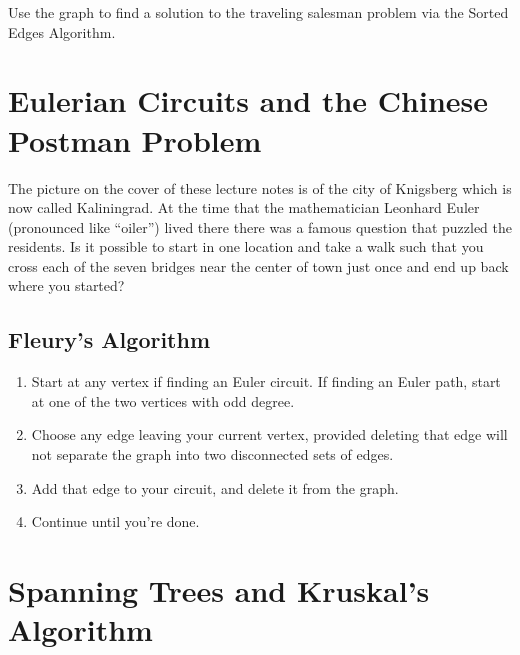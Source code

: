 \begin{exercise}\label{ex:sea}
  Use the graph to find a solution to the traveling salesman problem
  via the Sorted Edges Algorithm.

  

\end{exercise}

\newpage

\section{Eulerian Circuits and the Chinese Postman Problem}%
\label{sec:eulerian-circuits}

The picture on the cover of these lecture notes is of the city of
Knigsberg which is now called Kaliningrad. At the time that the
mathematician Leonhard Euler (pronounced like ``oiler'') lived there
there was a famous question that puzzled the residents. Is it possible
to start in one location and take a walk such that you cross each of
the seven bridges near the center of town just once and end up back
where you started?

\subsection{Fleury's Algorithm}%
\label{sub:Fleury's Algorithm}

\begin{algorithm}
  \begin{enumerate}
  \item Start at any vertex if finding an Euler circuit. If finding an
    Euler path, start at one of the two vertices with odd degree.
  \item Choose any edge leaving your current vertex, provided deleting
    that edge will not separate the graph into two disconnected sets
    of edges.
  \item Add that edge to your circuit, and delete it from the graph.
  \item Continue until you're done.
  \end{enumerate}
\end{algorithm}

\section{Spanning Trees and Kruskal's Algorithm}%
\label{sec:spanning-trees}

